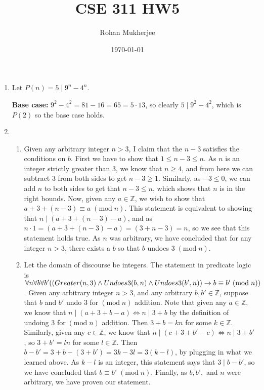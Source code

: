\documentclass[12pt]{article}
\title{CSE 311 HW5}
\date{\today}
\author{Rohan Mukherjee}
\def\mbb#1{\mathbb{#1}}
\def\bZ{\mbb{Z}}
\theoremstyle{definition}
\theoremstyle{remark}
\newcommand{\ra}{\rightarrow}
\renewcommand{\mod}[1]{\;(\mathrm{mod}\; #1)}
\begin{document}
	\maketitle
	\begin{enumerate}[leftmargin=\labelsep]
		\item Let $P(n) = 5 \mid 9^n - 4^n$. 
		
		\textbf{Base case:} $9^2 - 4^2 = 81 - 16 = 65 = 5 \cdot 13$, so clearly $5 \mid 9^2 - 4^2$, which is $P(2)$ so the base case holds.
		
		\newpage
		\item 
		\begin{enumerate}
			\item Given any arbitrary integer $n > 3$, I claim that the $n-3$ satisfies the conditions on $b$. First we have to show that $1 \leq n-3 \leq n$. As $n$ is an integer strictly greater than 3, we know that $n \geq 4$, and from here we can subtract 3 from both sides to get $n-3 \geq 1$. Similarly, as $-3 \leq 0$, we can add $n$ to both sides to get that $n-3 \leq n$, which shows that $n$ is in the right bounds. Now, given any $a \in \bZ$, we wish to show that $a + 3 + (n-3) \equiv a \mod n$. This statement is equivalent to showing that $n \mid (a + 3 + (n-3) - a)$, and as $n \cdot 1 = (a+3+(n-3)-a)=(3+n-3)=n$, so we see that this statement holds true. As $n$ was arbitrary, we have concluded that for any integer $n > 3$, there exists a $b$ so that $b$ undoes 3$\mod{n}$.
			\item Let the domain of discourse be integers. The statement in predicate logic is $\\\forall n \forall b \forall b' ((Greater(n, 3) \land Undoes3(b, n) \land Undoes3(b', n)) \ra b \equiv b' \mod{n})$. Given any arbitrary integer $n>3$, and any arbitrary $b, b' \in \bZ$, suppose that $b$ and $b'$ undo 3 for$\mod{n}$ addition. Note that given any $a \in \bZ$, we know that $n \mid (a+3+b-a) \iff n \mid 3+b$ by the definition of undoing 3 for$\mod{n}$ addition. Then $3+b = kn$ for some $k \in \bZ$. Similarly, given any $c \in \bZ$, we know that $n \mid (c+3+b'-c) \iff n \mid 3+b'$, so $3+b'=ln$ for some $l \in \bZ$. Then $b-b' = 3+b-(3+b')=3k-3l=3(k-l)$, by plugging in what we learned above. As $k-l$ is an integer, this statement says that $3 \mid b-b'$, so we have concluded that $b \equiv b' \mod{n}$. Finally, as $b, b', $ and $n$ were arbitrary, we have proven our statement.
		\end{enumerate}
	

\end{enumerate}
\end{document}
